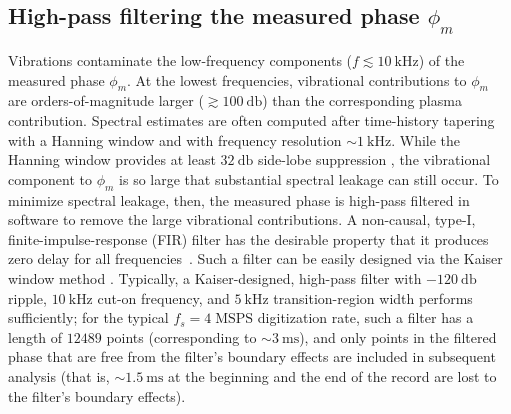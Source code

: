 \subsection{High-pass filtering the measured phase $\phi_m$}
\label{sec:Implementation:DataPreparation:high_pass_filtering}
Vibrations contaminate the low-frequency components
($f \lesssim \SI{10}{\kilo\hertz}$)
of the measured phase $\phi_m$.
At the lowest frequencies,
vibrational contributions to $\phi_m$
are orders-of-magnitude larger ($\gtrsim \SI{100}{\decibel}$)
than the corresponding plasma contribution.
Spectral estimates are often computed
after time-history tapering with a Hanning window and
with frequency resolution $\sim \SI{1}{\kilo\hertz}$.
While the Hanning window provides at least
$\SI{32}{\decibel}$ side-lobe suppression
\cite[Sec.~11.5.2.1]{bendat_and_piersol},
the vibrational component to $\phi_m$ is so large that
substantial spectral leakage can still occur.
To minimize spectral leakage, then,
the measured phase is high-pass filtered in software
to remove the large vibrational contributions.
A non-causal, type-I, finite-impulse-response (FIR) filter
has the desirable property that it produces zero delay
for all frequencies~\cite{kaiser_rsi77}\cite[Sec.~5.7.3]{oppenheim}.
Such a filter can be easily designed via
the Kaiser window method
\cite[Sec.~7.5.3]{oppenheim}\cite{scipy_kaiser_window}.
Typically, a Kaiser-designed, high-pass filter with
$\SI{-120}{\decibel}$ ripple,
$\SI{10}{\kilo\hertz}$ cut-on frequency, and
$\SI{5}{\kilo\hertz}$ transition-region width
performs sufficiently;
for the typical $f_s = 4 \; \text{MSPS}$ digitization rate,
such a filter has a length of $12489$ points
(corresponding to $\sim \SI{3}{\milli\second}$), and
only points in the filtered phase
that are free from the filter's boundary effects
are included in subsequent analysis
(that is, $\sim \SI{1.5}{\milli\second}$
at the beginning and the end of the record
are lost to the filter's boundary effects).


